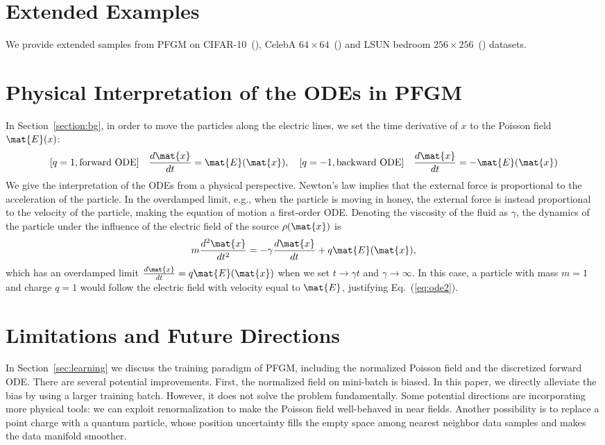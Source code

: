 \section{Extended Examples}
\label{app:samples}
We provide extended samples from PFGM on CIFAR-10~(), CelebA $64 \times 64$~() and {LSUN bedroom $256 \times 256$~() datasets.}


\section{Physical Interpretation of the ODEs in PFGM}\label{app:honey}

{In Section~\ref{section:bg}, in order to move the particles along the electric lines, we set the time derivative of $x$ to the Poisson field $\mat{E}(x)$:}
\begin{equation}\label{eq:ode2}
    [q=1, {\rm forward\  ODE}]\quad \frac{d\mat{x}}{dt} = \mat{E}(\mat{x}), \quad [q=-1, {\rm backward\  ODE}]\quad \frac{d\mat{x}}{dt} = -\mat{E}(\mat{x})
\end{equation}
{{We give the interpretation of the ODEs from a physical perspective. Newton's law implies that the external force is proportional to the acceleration of the particle. In the overdamped limit, e.g., when the particle is moving in honey, the external force is instead proportional to the velocity of the particle, making the equation of motion a first-order ODE.} 
Denoting the viscosity of the fluid as $\gamma$, the dynamics of the particle under the influence of the electric field of the source $\rho(\mat{x})$ is}
$$
    m\frac{d^2\mat{x}}{dt^2}=-\gamma\frac{d\mat{x}}{dt} + q\mat{E}(\mat{x}),
$$
{which has an overdamped limit  $\frac{d\mat{x}}{dt}=q\mat{E}(\mat{x})$ when we set $t\to\gamma t$ and $\gamma\to\infty$. In this case, a particle with mass $m=1$ and charge $q=1$ would follow the electric field with velocity equal to $\mat{E}$, justifying Eq.~(\ref{eq:ode2}).}

\section{Limitations and Future Directions}
\label{app:limit}

In Section~\ref{sec:learning} we discuss the training paradigm of PFGM, including the normalized Poisson field and the discretized forward ODE. There are several potential improvements. First, the normalized field on mini-batch is biased. In this paper, we directly alleviate the bias by using a larger training batch. However, it does not solve the problem fundamentally. Some potential directions are incorporating more physical tools: we can exploit renormalization to make the Poisson field well-behaved in near fields. Another possibility is to replace a point charge with a quantum particle, whose position uncertainty fills the empty space among nearest neighbor data samples and makes the data manifold smoother. 


